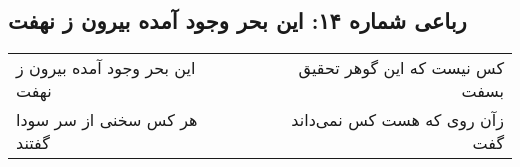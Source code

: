 \begin{center}
\section*{رباعی شماره ۱۴: این بحر وجود آمده بیرون ز نهفت}
\label{sec:sh014}
\begin{longtable}{l p{0.5cm} r}
این بحر وجود آمده بیرون ز نهفت
&&
کس نیست که این گوهر تحقیق بسفت
\\
هر کس سخنی از سر سودا گفتند
&&
زآن روی که هست کس نمی‌داند گفت
\\
\end{longtable}
\end{center}
